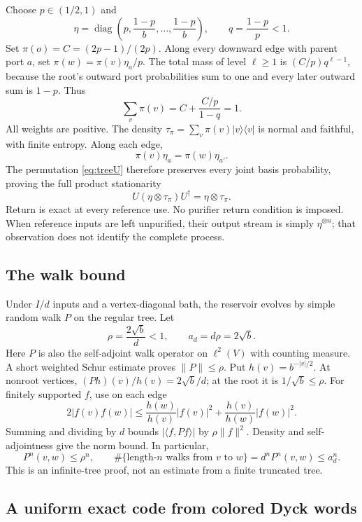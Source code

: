 \documentclass[11pt]{article}
\theoremstyle{definition}\newtheorem{definition}[theorem]{Definition}
\newcommand{\ket}[1]{\lvert #1\rangle}
\newcommand{\bra}[1]{\langle #1\rvert}
\newcommand{\norm}[1]{\lVert #1\rVert}
\begin{document}
Choose $p\in(1/2,1)$ and
\[
 \eta=\operatorname{diag}\left(p,\frac{1-p}{b},\ldots,\frac{1-p}{b}\right),
 \qquad q=\frac{1-p}{p}<1.
\]
Set $\pi(o)=C=(2p-1)/(2p)$. Along every downward edge with parent port $a$, set $\pi(w)=\pi(v)\eta_a/p$. The total mass of level $\ell\ge1$ is $(C/p)q^{\ell-1}$, because the root's outward port probabilities sum to one and every later outward sum is $1-p$. Thus
\[
 \sum_v\pi(v)=C+\frac{C/p}{1-q}=1.
\]
All weights are positive. The density $\tau_\pi=\sum_v\pi(v)\ket v\bra v$ is normal and faithful, with finite entropy. Along each edge,
\[
 \pi(v)\eta_a=\pi(w)\eta_{a'}.
\]
The permutation \eqref{eq:treeU} therefore preserves every joint basis probability, proving the full product stationarity
\begin{equation}
 U(\eta\otimes\tau_\pi)U^\dagger=\eta\otimes\tau_\pi.\label{eq:treeStationary}
\end{equation}
Return is exact at every reference use. No purifier return condition is imposed. When reference inputs are left unpurified, their output stream is simply $\eta^{\otimes n}$; that observation does not identify the complete process.

\subsection{The walk bound}

Under $I/d$ inputs and a vertex-diagonal bath, the reservoir evolves by simple random walk $P$ on the regular tree. Let
\[
 \rho=\frac{2\sqrt b}{d}<1,\qquad a_d=d\rho=2\sqrt b.
\]
Here $P$ is also the self-adjoint walk operator on $\ell^2(V)$ with counting measure. A short weighted Schur estimate proves $\norm P\le\rho$. Put $h(v)=b^{-|v|/2}$. At nonroot vertices, $(Ph)(v)/h(v)=2\sqrt b/d$; at the root it is $1/\sqrt b\le\rho$. For finitely supported $f$, use on each edge
\[
 2|f(v)f(w)|\le\frac{h(w)}{h(v)}|f(v)|^2+
 \frac{h(v)}{h(w)}|f(w)|^2.
\]
Summing and dividing by $d$ bounds $|\langle f,Pf\rangle|$ by $\rho\norm f^2$. Density and self-adjointness give the norm bound. In particular,
\begin{equation}
 P^n(v,w)\le\rho^n,\qquad
 \#\{\text{length-}n\text{ walks from }v\text{ to }w\}
 =d^nP^n(v,w)\le a_d^n.\label{eq:walk}
\end{equation}
This is an infinite-tree proof, not an estimate from a finite truncated tree.

\subsection{A uniform exact code from colored Dyck words}
\end{document}
